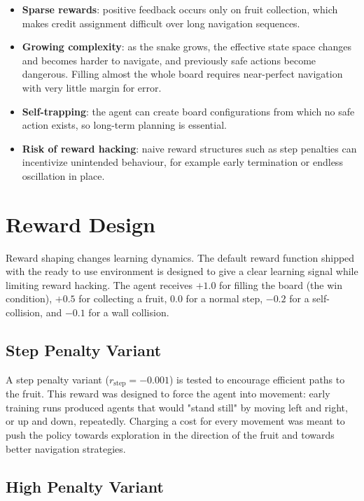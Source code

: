 \documentclass[10pt, conference, letterpaper]{IEEEtran}
\begin{document}
\begin{itemize}
  \item \textbf{Sparse rewards}: positive feedback occurs only on fruit collection, which makes credit assignment difficult over long navigation sequences.
  \item \textbf{Growing complexity}: as the snake grows, the effective state space changes and becomes harder to navigate, and previously safe actions become dangerous. Filling almost the whole board requires near-perfect navigation with very little margin for error.
  \item \textbf{Self-trapping}: the agent can create board configurations from which no safe action exists, so long-term planning is essential.
  \item \textbf{Risk of reward hacking}: naive reward structures such as step penalties can incentivize unintended behaviour, for example early termination or endless oscillation in place.
\end{itemize}

\section{Reward Design}

Reward shaping changes learning dynamics. The default reward function shipped with the ready to use environment is designed to give a clear learning signal while limiting reward hacking. The agent receives $+1.0$ for filling the board (the win condition), $+0.5$ for collecting a fruit, $0.0$ for a normal step, $-0.2$ for a self-collision, and $-0.1$ for a wall collision.

\subsection{Step Penalty Variant}

A step penalty variant ($r_{\text{step}} = -0.001$) is tested to encourage efficient paths to the fruit. This reward was designed to force the agent into movement: early training runs produced agents that would "stand still" by moving left and right, or up and down, repeatedly. Charging a cost for every movement was meant to push the policy towards exploration in the direction of the fruit and towards better navigation strategies.

\subsection{High Penalty Variant}
\end{document}

